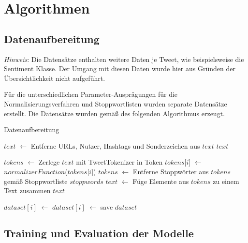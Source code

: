 \section{Algorithmen}

\subsection{Datenaufbereitung}

\textit{Hinweis}: Die Datensätze enthalten weitere Daten je Tweet, wie beispielsweise die Sentiment Klasse.
Der Umgang mit diesen Daten wurde hier aus Gründen der Übersichtlichkeit nicht aufgeführt.

Für die unterschiedlichen Parameter-Ausprägungen für die Normalisierungsverfahren und Stoppwortlisten wurden separate Datensätze erstellt.
Die Datensätze wurden gemäß des folgenden Algorithmus erzeugt.
\begin{algorithm}
    \caption{Datenaufbereitung}
    \begin{algorithmic}[1]
                \State $text$ $\gets$ Entferne URLs, Nutzer, Hashtags und Sonderzeichen aus $text$
                \State \Return $text$
            \EndFunction

                \State $tokens$ $\gets$ Zerlege $text$ mit TweetTokenizer in Token
                    \State $tokens$[$i$] $\gets$ $normalizerFunction$($tokens$[$i$])
                \EndFor
                \State $tokens$ $\gets$ Entferne Stoppwörter aus $tokens$ gemäß Stoppwortliste $stoppwords$
                \State $text$ $\gets$ Füge Elemente aus $tokens$ zu einem Text zusammen
                \State \Return $text$
            \EndFunction

                \State $dataset[i]$ $\gets$ 
                \State $dataset[i]$ $\gets$ 
            \EndFor
            \State save $dataset$
        \EndProcedure
    \end{algorithmic}
    \label{alg:data-preparation}
\end{algorithm}

\subsection{Training und Evaluation der Modelle}

